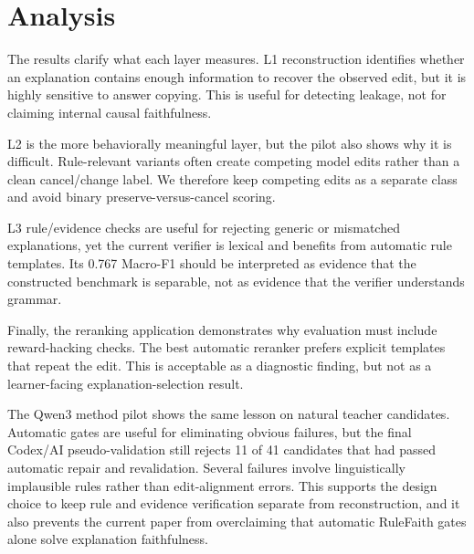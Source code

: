 \section{Analysis}

The results clarify what each layer measures. L1 reconstruction identifies whether an explanation contains enough information to recover the observed edit, but it is highly sensitive to answer copying. This is useful for detecting leakage, not for claiming internal causal faithfulness.

L2 is the more behaviorally meaningful layer, but the pilot also shows why it is difficult. Rule-relevant variants often create competing model edits rather than a clean cancel/change label. We therefore keep competing edits as a separate class and avoid binary preserve-versus-cancel scoring.

L3 rule/evidence checks are useful for rejecting generic or mismatched explanations, yet the current verifier is lexical and benefits from automatic rule templates. Its 0.767 Macro-F1 should be interpreted as evidence that the constructed benchmark is separable, not as evidence that the verifier understands grammar.

Finally, the reranking application demonstrates why evaluation must include reward-hacking checks. The best automatic reranker prefers explicit templates that repeat the edit. This is acceptable as a diagnostic finding, but not as a learner-facing explanation-selection result.

The Qwen3 method pilot shows the same lesson on natural teacher candidates. Automatic gates are useful for eliminating obvious failures, but the final Codex/AI pseudo-validation still rejects 11 of 41 candidates that had passed automatic repair and revalidation. Several failures involve linguistically implausible rules rather than edit-alignment errors. This supports the design choice to keep rule and evidence verification separate from reconstruction, and it also prevents the current paper from overclaiming that automatic RuleFaith gates alone solve explanation faithfulness.
